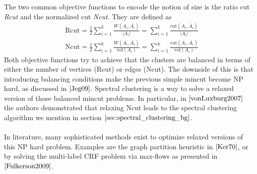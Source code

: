 The two common objective functions to encode the notion of size is the ratio cut \textit{Rcut} and the normalized cut \textit{Ncut}. They are defined as
\begin{equation}
\begin{aligned}
&\text{Rcut} = \frac{1}{2} \sum_{i=1}^k \frac{W(A_i, \bar{A_i})}{\left| A_i\right|} = \sum_{i=1}^k \frac{\text{cut}(A_i, \bar{A_i})}{\left| A_i\right|} \\
&\text{Ncut} = \frac{1}{2} \sum_{i=1}^k \frac{W(A_i, \bar{A_i})}{\text{vol}(A_i)} = \sum_{i=1}^k \frac{\text{cut}(A_i, \bar{A_i})}{\text{vol}(A_i)}
\end{aligned}
\end{equation}
Both objective functions try to achieve that the clusters are balanced in terms of either the number of vertices (Rcut) or edges (Ncut). The downside of this is that introducing balancing conditions make the previous simple mincut become NP hard, as discussed in $\cite{Jeg09}$. Spectral clustering is a way to solve a relaxed version of those balanced mincut problems. In particular, in $\cite{vonLuxburg2007}$ the authors demonstrated that relaxing Ncut leads to the spectral clustering algorithm we mention in section $\ref{sec:spectral_clustering_bg}$. \\ \\
In literature, many sophisticated methods exist to optimize relaxed versions of this NP hard problem. Examples are the graph partition heuristic in $\cite{Ker70}$, or by solving the multi-label CRF problem via max-flows as presented in $\cite{Fulkerson2009}$.

